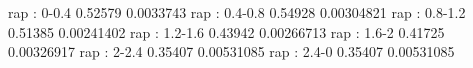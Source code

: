 rap : 0-0.4
0.52579 0.0033743
rap : 0.4-0.8
0.54928 0.00304821
rap : 0.8-1.2
0.51385 0.00241402
rap : 1.2-1.6
0.43942 0.00266713
rap : 1.6-2
0.41725 0.00326917
rap : 2-2.4
0.35407 0.00531085
rap : 2.4-0
0.35407 0.00531085
